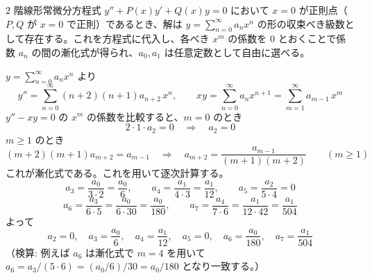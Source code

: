 
$2$ 階線形常微分方程式 $y'' + P(x)y' + Q(x)y = 0$ において $x=0$ が正則点（$P,Q$ が $x=0$ で正則）であるとき、解は $y = \sum_{n=0}^{\infty} a_n x^n$ の形の収束べき級数として存在する。これを方程式に代入し、各べき $x^m$ の係数を $0$ とおくことで係数 $a_n$ の間の漸化式が得られ、$a_0, a_1$ は任意定数として自由に選べる。

$y = \displaystyle\sum_{n=0}^{\infty} a_n x^n$ より
\[
y'' = \sum_{n=0}^{\infty} (n+2)(n+1)a_{n+2}\,x^{n}, \qquad
xy = \sum_{n=0}^{\infty} a_n x^{n+1} = \sum_{m=1}^{\infty} a_{m-1}\,x^{m}
\]
$y''-xy=0$ の $x^m$ の係数を比較すると、$m=0$ のとき
\[
2\cdot 1\cdot a_2 = 0 \quad\Longrightarrow\quad a_2 = 0
\]
$m\ge 1$ のとき
\[
(m+2)(m+1)a_{m+2} = a_{m-1}
\quad\Longrightarrow\quad
a_{m+2} = \frac{a_{m-1}}{(m+1)(m+2)} \qquad (m \ge 1)
\]
これが漸化式である。これを用いて逐次計算する。
\[
a_3 = \frac{a_0}{3\cdot 2} = \frac{a_0}{6}, \qquad
a_4 = \frac{a_1}{4\cdot 3} = \frac{a_1}{12}, \qquad
a_5 = \frac{a_2}{5\cdot 4} = 0
\]
\[
a_6 = \frac{a_3}{6\cdot 5} = \frac{a_0}{6\cdot 30} = \frac{a_0}{180}, \qquad
a_7 = \frac{a_4}{7\cdot 6} = \frac{a_1}{12\cdot 42} = \frac{a_1}{504}
\]
よって
\[
\boxed{\;
a_2 = 0,\quad a_3=\frac{a_0}{6},\quad a_4=\frac{a_1}{12},\quad a_5=0,\quad a_6=\frac{a_0}{180},\quad a_7=\frac{a_1}{504}
\;}
\]
（検算: 例えば $a_6$ は漸化式で $m=4$ を用いて $a_6 = a_3/(5\cdot 6) = (a_0/6)/30 = a_0/180$ となり一致する。）
